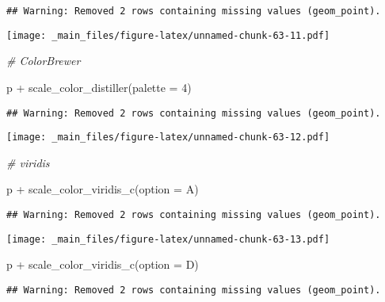 \documentclass[
]{book}
\newenvironment{Shaded}{\begin{snugshade}}{\end{snugshade}}
\newcommand{\AttributeTok}[1]{\textcolor[rgb]{0.77,0.63,0.00}{#1}}
\newcommand{\CommentTok}[1]{\textcolor[rgb]{0.56,0.35,0.01}{\textit{#1}}}
\newcommand{\DecValTok}[1]{\textcolor[rgb]{0.00,0.00,0.81}{#1}}
\newcommand{\FunctionTok}[1]{\textcolor[rgb]{0.00,0.00,0.00}{#1}}
\newcommand{\NormalTok}[1]{#1}
\newcommand{\SpecialCharTok}[1]{\textcolor[rgb]{0.00,0.00,0.00}{#1}}
\newcommand{\StringTok}[1]{\textcolor[rgb]{0.31,0.60,0.02}{#1}}
\begin{document}
\begin{verbatim}
## Warning: Removed 2 rows containing missing values (geom_point).
\end{verbatim}

\texttt{[image: \_main\_files/figure-latex/unnamed-chunk-63-11.pdf]}

\begin{Shaded}
\begin{Highlighting}[]
\CommentTok{\# ColorBrewer}

\NormalTok{p }\SpecialCharTok{+} \FunctionTok{scale\_color\_distiller}\NormalTok{(}\AttributeTok{palette =} \DecValTok{4}\NormalTok{)}
\end{Highlighting}
\end{Shaded}

\begin{verbatim}
## Warning: Removed 2 rows containing missing values (geom_point).
\end{verbatim}

\texttt{[image: \_main\_files/figure-latex/unnamed-chunk-63-12.pdf]}

\begin{Shaded}
\begin{Highlighting}[]
\CommentTok{\# viridis}

\NormalTok{p }\SpecialCharTok{+} \FunctionTok{scale\_color\_viridis\_c}\NormalTok{(}\AttributeTok{option =} \StringTok{\textquotesingle{}A\textquotesingle{}}\NormalTok{)}
\end{Highlighting}
\end{Shaded}

\begin{verbatim}
## Warning: Removed 2 rows containing missing values (geom_point).
\end{verbatim}

\texttt{[image: \_main\_files/figure-latex/unnamed-chunk-63-13.pdf]}

\begin{Shaded}
\begin{Highlighting}[]
\NormalTok{p }\SpecialCharTok{+} \FunctionTok{scale\_color\_viridis\_c}\NormalTok{(}\AttributeTok{option =} \StringTok{\textquotesingle{}D\textquotesingle{}}\NormalTok{)}
\end{Highlighting}
\end{Shaded}

\begin{verbatim}
## Warning: Removed 2 rows containing missing values (geom_point).
\end{verbatim}
\end{document}
